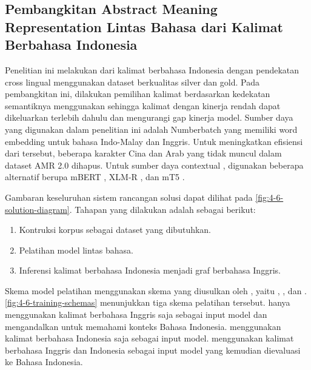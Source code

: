 \subsection{Pembangkitan Abstract Meaning Representation Lintas Bahasa dari Kalimat Berbahasa Indonesia }

Penelitian ini melakukan \amrparsing{} dari kalimat berbahasa Indonesia dengan pendekatan cross lingual menggunakan dataset berkualitas silver dan gold.
Pada pembangkitan ini, dilakukan pemilihan kalimat berdasarkan kedekatan semantiknya menggunakan \cossim{} sehingga kalimat dengan kinerja rendah dapat dikeluarkan terlebih dahulu dan mengurangi gap kinerja model.
Sumber daya yang digunakan dalam penelitian ini adalah \mwordem{} Numberbatch yang memiliki word embedding untuk bahasa Indo-Malay dan Inggris.
Untuk meningkatkan efisiensi dari \wordem{} tersebut, beberapa karakter Cina dan Arab yang tidak muncul dalam dataset AMR 2.0 dihapus.
Untuk sumber daya contextual \mwordem{}, digunakan beberapa alternatif berupa mBERT , XLM-R , dan mT5 .

Gambaran keseluruhan sistem rancangan solusi dapat dilihat pada \cref{fig:4-6-solution-diagram}.
Tahapan yang dilakukan adalah sebagai berikut:
\begin{enumerate}
  \item Kontruksi korpus sebagai dataset yang dibutuhkan.
  \item Pelatihan model \amrparsing{} lintas bahasa.
  \item Inferensi kalimat berbahasa Indonesia menjadi graf \AMR{} berbahasa Inggris.
\end{enumerate}


Skema model pelatihan \crosslingual{} \amrparsing{} menggunakan skema yang diusulkan oleh \textcite{blloshmi2020}, yaitu , , dan .
\cref{fig:4-6-training-schemas} menunjukkan tiga skema pelatihan tersebut.
 hanya menggunakan kalimat berbahasa Inggris saja sebagai input model dan mengandalkan \mwordem{} untuk memahami konteks Bahasa Indonesia.
 menggunakan kalimat berbahasa Indonesia saja sebagai input model.
 menggunakan kalimat berbahasa Inggris dan Indonesia sebagai input model yang kemudian dievaluasi ke Bahasa Indonesia.

